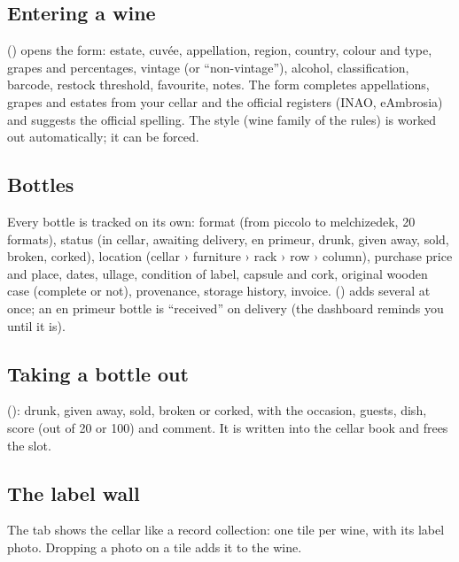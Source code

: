 \documentclass[11pt,a4paper]{article}
\begin{document}

\subsection{Entering a wine}
 () opens the form: estate, cuvée, appellation, region, country,
colour and type, grapes and percentages, vintage (or ``non-vintage''), alcohol, classification, barcode,
restock threshold, favourite, notes. The form completes appellations, grapes and estates from your cellar and
the official registers (INAO, eAmbrosia) and suggests the official spelling. The style (wine family of the
rules) is worked out automatically; it can be forced.


\subsection{Bottles}
Every bottle is tracked on its own: format (from piccolo to melchizedek, 20 formats), status (in cellar,
awaiting delivery, en primeur, drunk, given away, sold, broken, corked), location (cellar › furniture › rack ›
row › column), purchase price and place, dates, ullage, condition of label, capsule and cork, original wooden
case (complete or not), provenance, storage history, invoice. 
() adds several at once; an en primeur bottle is ``received'' on delivery (the dashboard
reminds you until it is).


\subsection{Taking a bottle out}
 (): drunk, given away, sold, broken or
corked, with the occasion, guests, dish, score (out of 20 or 100) and comment. It is written into the cellar
book and frees the slot.


\subsection{The label wall}
The  tab shows the cellar like a record collection: one tile per wine, with its label photo.
Dropping a photo on a tile adds it to the wine.
\end{document}
